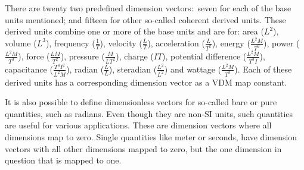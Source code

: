 \documentclass[runningheads,a4paper]{llncs}
\begin{document}
There are twenty two predefined dimension vectors:~seven for each of the base units mentioned; and fifteen for other so-called coherent derived units. These derived units combine one or more of the base units and are for:
%
%
area (\(L^2\)), volume (\(L^3\)), frequency (\(\frac{1}{T}\)), velocity (\(\frac{L}{T}\)), acceleration (\(\frac{L}{T^2}\)), energy (\(\frac{L^2M}{T^2}\)), power (\(\frac{L^2M}{T^3}\)), force (\(\frac{LM}{T^2}\)), pressure (\(\frac{M}{LT^2}\)), charge (\(IT\)), potential difference (\(\frac{L^2M}{T^3I}\)), capacitance (\(\frac{T^4I^2}{L^2M}\)), radian (\(\frac{L}{L}\)), steradian (\(\frac{L^2}{L^2}\)) and wattage (\(\frac{L^2M}{T^3}\)). 
%
Each of these derived units has a corresponding dimension vector as a VDM map constant. 

It is also possible to define dimensionless vectors for so-called bare or pure quantities, such as radians. Even though they are non-SI units, such quantities are useful for various applications. These are dimension vectors where all dimensions map to zero. Single quantities like meter or seconds, have dimension vectors with all other dimensions mapped to zero, but the one dimension in question that is mapped to one.  
\end{document}
